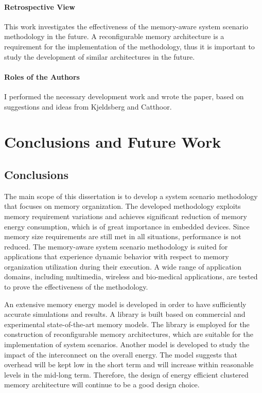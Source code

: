\subsubsection{Retrospective View}

This work investigates the effectiveness of the memory-aware system scenario methodology in the future.
A reconfigurable memory architecture is a requirement for the implementation of the methodology, thus it is important to study the development of similar architectures in the future. 

\subsubsection{Roles of the Authors}

I performed the necessary development work and wrote the paper, based on suggestions and ideas from Kjeldsberg and Catthoor. 

\chapter{Conclusions and Future Work}
\label{conclusions}

\section{Conclusions}

The main scope of this dissertation is to develop a system scenario methodology that focuses on memory organization. 
The developed methodology exploits memory requirement variations and achieves significant reduction of memory energy consumption, which is of great importance in embedded devices. Since memory size requirements are still met in all situations, performance is not reduced. 
The memory-aware system scenario methodology is suited for applications that experience dynamic behavior with respect to memory organization utilization during their execution.
A wide range of application domains, including multimedia, wireless and bio-medical applications, are tested to prove the effectiveness of the methodology.

An extensive memory energy model is developed in order to have sufficiently accurate simulations and results.
A library is built based on commercial and experimental state-of-the-art memory models.
The library is employed for the construction of reconfigurable memory architectures, which are suitable for the implementation of system scenarios.
Another model is developed to study the impact of the interconnect on the overall energy.
The model suggests that overhead will be kept low in the short term and will increase within reasonable levels in the mid-long term.
Therefore, the design of energy efficient clustered memory architecture will continue to be a good design choice.

